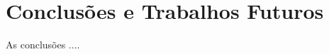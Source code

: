 \documentclass[11pt]{article}
\begin{document}
\section{Conclusões e Trabalhos Futuros}
\label{sec:conclusao}

As conclusões ....





\end{document}
